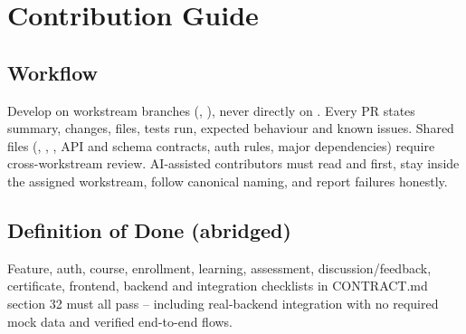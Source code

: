\section{Contribution Guide}
\label{sec:contribution-guide}

\subsection{Workflow}

Develop on workstream branches (, ), never directly on . Every PR states summary, changes, files, tests run, expected behaviour and known issues. Shared files (, , , API and schema contracts, auth rules, major dependencies) require cross-workstream review. AI-assisted contributors must read  and  first, stay inside the assigned workstream, follow canonical naming, and report failures honestly.

\subsection{Definition of Done (abridged)}

Feature, auth, course, enrollment, learning, assessment, discussion/feedback, certificate, frontend, backend and integration checklists in CONTRACT.md section 32 must all pass -- including real-backend integration with no required mock data and verified end-to-end flows.
